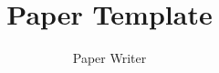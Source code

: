 \documentclass[a4paper]{article}
\begin{document}
\title{Paper Template}

\author{%
  Paper Writer
}

\maketitle







\printbibliography{}
\end{document}
